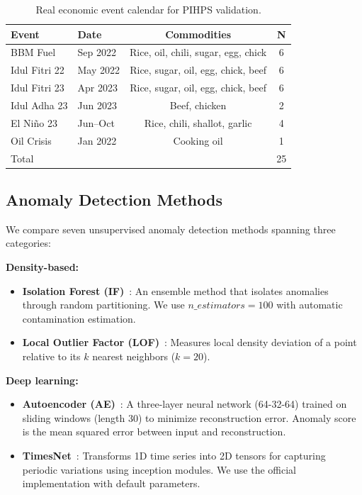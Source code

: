 \documentclass[10pt]{article}
\begin{document}
\begin{table}[h]
\centering
\caption{Real economic event calendar for PIHPS validation.}
\label{tab:events}
\footnotesize
\setlength{\tabcolsep}{2pt}
\begin{tabular}{llcc}
\toprule
Event & Date & Commodities & N \\
\midrule
BBM Fuel      & Sep 2022 & Rice, oil, chili, sugar, egg, chick & 6 \\
Idul Fitri 22 & May 2022 & Rice, sugar, oil, egg, chick, beef  & 6 \\
Idul Fitri 23 & Apr 2023 & Rice, sugar, oil, egg, chick, beef  & 6 \\
Idul Adha 23  & Jun 2023 & Beef, chicken                        & 2 \\
El Ni\~no 23  & Jun--Oct & Rice, chili, shallot, garlic        & 4 \\
Oil Crisis    & Jan 2022 & Cooking oil                          & 1 \\
\midrule
Total         &          &                                      & 25 \\
\bottomrule
\end{tabular}
\end{table}

\subsection{Anomaly Detection Methods}

We compare seven unsupervised anomaly detection methods spanning three categories:

\noindent\textbf{Density-based:}
\begin{itemize}[leftmargin=*,nosep]
    \item \textbf{Isolation Forest (IF)}~\cite{liu2008isolation}: An ensemble method that isolates anomalies through random partitioning. We use $n\_estimators=100$ with automatic contamination estimation.
    \item \textbf{Local Outlier Factor (LOF)}~\cite{breunig2000lof}: Measures local density deviation of a point relative to its $k$ nearest neighbors ($k=20$).
\end{itemize}

\noindent\textbf{Deep learning:}
\begin{itemize}[leftmargin=*,nosep]
    \item \textbf{Autoencoder (AE)}~\cite{darban2022survey}: A three-layer neural network (64-32-64) trained on sliding windows (length 30) to minimize reconstruction error. Anomaly score is the mean squared error between input and reconstruction.
    \item \textbf{TimesNet}~\cite{wu2023timesnet}: Transforms 1D time series into 2D tensors for capturing periodic variations using inception modules. We use the official implementation with default parameters.
\end{itemize}
\end{document}
